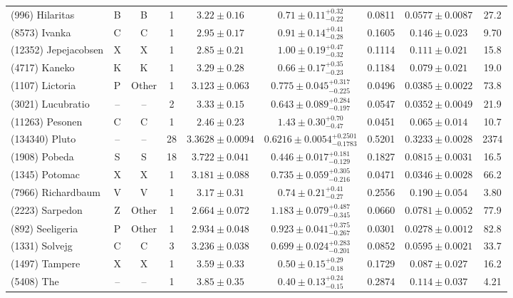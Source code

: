 \begin{table}[t]
\begin{tabular}{lcccccccc}
(996) Hilaritas & B & B & 1 & $3.22 \pm 0.16$ & $0.71 \pm 0.11{}_{-0.22}^{+0.32}$ & 0.0811 & $0.0577 \pm 0.0087$ & 27.2 \\
(8573) Ivanka & C & C & 1 & $2.95 \pm 0.17$ & $0.91 \pm 0.14{}_{-0.28}^{+0.41}$ & 0.1605 & $0.146 \pm 0.023$ & 9.70 \\
(12352) Jepejacobsen & X & X & 1 & $2.85 \pm 0.21$ & $1.00 \pm 0.19{}_{-0.32}^{+0.47}$ & 0.1114 & $0.111 \pm 0.021$ & 15.8 \\
(4717) Kaneko & K & K & 1 & $3.29 \pm 0.28$ & $0.66 \pm 0.17{}_{-0.23}^{+0.35}$ & 0.1184 & $0.079 \pm 0.021$ & 19.0 \\
(1107) Lictoria & P & Other & 1 & $3.123 \pm 0.063$ & $0.775 \pm 0.045{}_{-0.225}^{+0.317}$ & 0.0496 & $0.0385 \pm 0.0022$ & 73.8 \\
(3021) Lucubratio & -- & -- & 2 & $3.33 \pm 0.15$ & $0.643 \pm 0.089{}_{-0.197}^{+0.284}$ & 0.0547 & $0.0352 \pm 0.0049$ & 21.9 \\
(11263) Pesonen & C & C & 1 & $2.46 \pm 0.23$ & $1.43 \pm 0.30{}_{-0.47}^{+0.70}$ & 0.0451 & $0.065 \pm 0.014$ & 10.7 \\
(134340) Pluto & -- & -- & 28 & $3.3628 \pm 0.0094$ & $0.6216 \pm 0.0054{}_{-0.1783}^{+0.2501}$ & 0.5201 & $0.3233 \pm 0.0028$ & 2374 \\
(1908) Pobeda & S & S & 18 & $3.722 \pm 0.041$ & $0.446 \pm 0.017{}_{-0.129}^{+0.181}$ & 0.1827 & $0.0815 \pm 0.0031$ & 16.5 \\
(1345) Potomac & X & X & 1 & $3.181 \pm 0.088$ & $0.735 \pm 0.059{}_{-0.216}^{+0.305}$ & 0.0471 & $0.0346 \pm 0.0028$ & 66.2 \\
(7966) Richardbaum & V & V & 1 & $3.17 \pm 0.31$ & $0.74 \pm 0.21{}_{-0.27}^{+0.41}$ & 0.2556 & $0.190 \pm 0.054$ & 3.80 \\
(2223) Sarpedon & Z & Other & 1 & $2.664 \pm 0.072$ & $1.183 \pm 0.079{}_{-0.345}^{+0.487}$ & 0.0660 & $0.0781 \pm 0.0052$ & 77.9 \\
(892) Seeligeria & P & Other & 1 & $2.934 \pm 0.048$ & $0.923 \pm 0.041{}_{-0.267}^{+0.375}$ & 0.0301 & $0.0278 \pm 0.0012$ & 82.8 \\
(1331) Solvejg & C & C & 3 & $3.236 \pm 0.038$ & $0.699 \pm 0.024{}_{-0.201}^{+0.283}$ & 0.0852 & $0.0595 \pm 0.0021$ & 33.7 \\
(1497) Tampere & X & X & 1 & $3.59 \pm 0.33$ & $0.50 \pm 0.15{}_{-0.18}^{+0.29}$ & 0.1729 & $0.087 \pm 0.027$ & 16.2 \\
(5408) The & -- & -- & 1 & $3.85 \pm 0.35$ & $0.40 \pm 0.13{}_{-0.15}^{+0.24}$ & 0.2874 & $0.114 \pm 0.037$ & 4.21 \\

\end{tabular}
\end{table}
